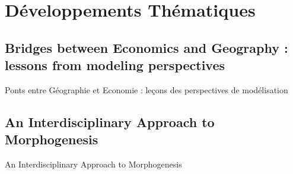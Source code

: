 



\newpage

\chapter{Développements Thématiques}

\label{app:thematic} %











\section[Bridges between Economics and Geography][Ponts entre Géographie et Economie]{Bridges between Economics and Geography : lessons from modeling perspectives}{Ponts entre Géographie et Economie : leçons des perspectives de modélisation}

\label{app:sec:ecogeo}














\stars

\newpage






\section{An Interdisciplinary Approach to Morphogenesis}{An Interdisciplinary Approach to Morphogenesis}

\label{app:sec:morphogenesis} %

